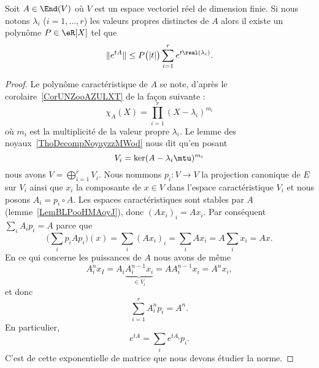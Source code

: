 \begin{lemma}   \label{LemQEARooLRXEef}
	Soit \( A\in\End(V)\) où \( V\) est un espace vectoriel réel de dimension finie. Si nous notons \( \lambda_i\) (\( i=1,\ldots, r\)) les valeurs propres distinctes de \( A\) alors il existe un polynôme \( P\in \eR[X]\) tel que
	\begin{equation}
		\|  e^{tA} \|\leq P\big( | t | \big)\sum_{i=1}^r e^{t\real(\lambda_i)}.
	\end{equation}
\end{lemma}

\begin{proof}
	Le polynôme caractéristique de \( A\) se note, d'après le corolaire~\ref{CorUNZooAZULXT} de la façon suivante :
	\begin{equation}
		\chi_A(X)=\prod_{i=1}^r(X-\lambda_i)^{m_i}
	\end{equation}
	où \( m_i\) est la multiplicité de la valeur propre \( \lambda_i\). Le lemme des noyaux~\ref{ThoDecompNoyayzzMWod} nous dit qu'en posant
	\begin{equation}
		V_i=\ker(A-\lambda_i\mtu)^{m_i}
	\end{equation}
	nous avons \( V=\bigoplus_{i=1}^rV_i\). Nous nommons \( p_i\colon V\to V\) la projection canonique de \( E\) sur \( V_i\) ainsi que \( x_i\) la composante de \( x\in V\) dans l'espace caractéristique \( V_i\) et nous posons \( A_i=p_i\circ A\). Les espaces caractéristiques sont stables par \( A\) (lemme~\ref{LemBLPooHMAoyJ}), donc \( (Ax_i)_i=Ax_i\). Par conséquent \( \sum_i A_ip_i=A\) parce que
	\begin{equation}
		\big( \sum_ip_iAp_i \big)(x)=\sum_i(Ax_i)_i=\sum_iAx_i=A\sum_ix_i=Ax.
	\end{equation}
	En ce qui concerne les puissances de \( A\) nous avons de même
	\begin{equation}
		A_i^nx_I=A_i\underbrace{A_i^{n-1}x_i}_{\in V_i}=AA_i^{n-1}x_i=A^nx_i,
	\end{equation}
	et donc
	\begin{equation}
		\sum_{i=1}^rA_i^np_i=A^n.
	\end{equation}
	En particulier,
	\begin{equation}    \label{EqPVIooGxwFBH}
		e^{tA}=\sum_i e^{tA_i}p_i.
	\end{equation}
	C'est de cette exponentielle de matrice que nous devons étudier la norme.


\end{proof}
